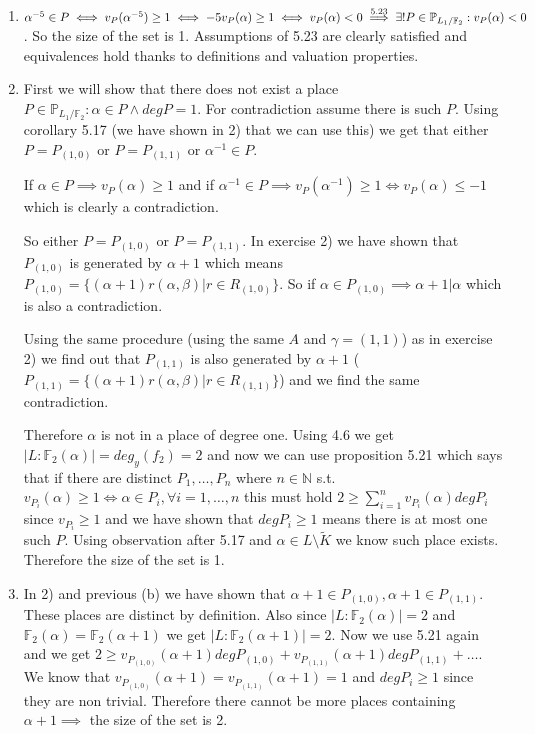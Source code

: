 \documentclass[12pt, a4paper]{article}
\begin{document}
\section{}
\begin{enumerate}[label=(\alph*)]
\item $\alpha^{-5} \in P \iff v_P(\alpha^{-5})\geq 1 \iff -5v_P(\alpha)\geq 1 \iff v_P(\alpha) < 0 \stackrel{\text{5.23}}{\implies} \\\exists! P \in \mathbb{P}_{L_1/\mathbb{F}_2} : v_P(\alpha)<0$. So the size of the set is 1. Assumptions of 5.23 are clearly satisfied and equivalences hold thanks to definitions and valuation properties.

\item First we will show that there does not exist a place $P \in \mathbb{P}_{L_1/\mathbb{F}_2}: \alpha \in P \land deg P = 1$. For contradiction assume there is such $P$. Using corollary 5.17 (we have shown in 2) that we can use this) we get that either $P = P_{(1,0)}$ or $P = P_{(1,1)}$ or $\alpha^{-1} \in P$. 

If $\alpha \in P \implies v_P(\alpha)\geq 1$ and if $\alpha^{-1} \in P \implies v_P(\alpha^{-1}) \geq 1 \iff v_P(\alpha) \leq -1$ which is clearly a contradiction. 

So either $P = P_{(1,0)}$ or $P = P_{(1,1)}$. In exercise 2) we have shown that $P_{(1,0)}$ is generated by $\alpha+1$ which means $P_{(1,0)}=\{(\alpha+1)r(\alpha,\beta)|r\in R_{(1,0)}\}$. So if $\alpha \in P_{(1,0)} \implies \alpha + 1 | \alpha$ which is also a contradiction. 

Using the same procedure (using the same $A$ and $\gamma =(1,1)$) as in exercise 2) we find out that $P_{(1,1)}$ is also generated by $\alpha+1$ ($P_{(1,1)}=\{(\alpha+1)r(\alpha,\beta)|r\in R_{(1,1)}\}$) and we find the same contradiction.

Therefore $\alpha$ is not in a place of degree one. Using 4.6 we get $|L:\mathbb{F}_2(\alpha)|=deg_y(f_2)=2$ and now we can use proposition 5.21 which says that if there are distinct $P_1,\dots,P_n$ where $n\in \mathbb{N}$ s.t. $v_{P_i}(\alpha)\geq 1 \iff \alpha \in P_i, \forall i=1,\dots,n$ this must hold $2\geq \sum_{i=1}^n v_{P_i}(\alpha) deg P_i$ since $v_{P_i}\geq 1$ and we have shown that $degP_i \geq 1$ means there is at most one such $P$. Using observation after 5.17 and $\alpha \in L \setminus \tilde{K}$ we know such place exists. Therefore the size of the set is 1.

\item In 2) and previous (b) we have shown that $\alpha+1 \in P_{(1,0)}, \alpha+1 \in P_{(1,1)}$. These places are distinct by definition. Also since $|L:\mathbb{F}_2(\alpha)| = 2$ and $\mathbb{F}_2(\alpha) = \mathbb{F}_2(\alpha+1)$ we get $|L:\mathbb{F}_2(\alpha+1)| = 2$. Now we use 5.21 again and we get $2\geq v_{P_{(1,0)}}(\alpha+1)degP_{(1,0)} + v_{P_{(1,1)}}(\alpha+1)degP_{(1,1)} + \dots$. We know that $v_{P_{(1,0)}}(\alpha+1) = v_{P_{(1,1)}}(\alpha+1) = 1$ and $deg P_i \geq 1$ since they are non trivial. Therefore there cannot be more places containing $\alpha+1 \implies$ the size of the set is 2.


\end{enumerate}
\end{document}
